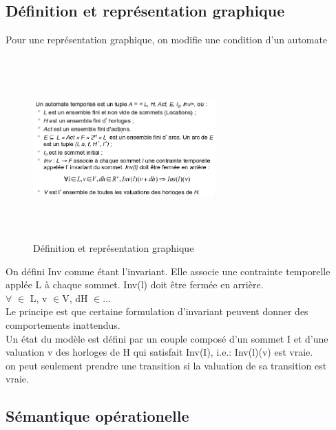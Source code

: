 \documentclass[oneside]{book}
\begin{document}
    \subsection{Définition et représentation graphique}
    Pour une représentation graphique, on  modifie une condition d'un automate \\
    
    \begin{figure}[!ht]
    	\centering
    	\includegraphics[width = 7cm, height = 7cm, keepaspectratio]{Images/definition_representation_graphique.png}
    	\caption{Définition et représentation graphique}
    	\label{fig:DefinitionRepGraphique}
    \end{figure}

    On défini Inv comme étant l'invariant. Elle associe une contrainte temporelle applée L à chaque sommet. Inv(l) doit être fermée en arrière.\\
    
    $\forall$ $\in$ L, v $\in$V, dH $\in$...\\
    
    Le principe est que certaine formulation d'invariant peuvent donner des comportements inattendus.\\
    
    Un état du modèle est défini par un couple composé d'un sommet I et d'une valuation v des horloges de H qui satisfait Inv(I), i.e.: Inv(l)(v) est vraie.\\
    
    on peut seulement prendre une transition si la valuation de sa transition est vraie.\\
    
    
    
    \subsection{Sémantique opérationelle}    
    
\end{document}
